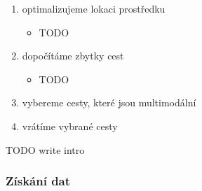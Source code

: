 \documentclass[thesis=M,czech]{FITthesis}[2019/12/23]
\theoremstyle{plain}
\theoremstyle{definition}
\begin{document}
\begin{enumerate}
	\item optimalizujeme lokaci prostředku
	\begin{itemize}
		\item TODO
	\end{itemize}
	\item dopočítáme zbytky cest
	\begin{itemize}
		\item TODO
	\end{itemize}
	\item vybereme cesty, které jsou multimodální
	\item vrátíme vybrané cesty



\end{enumerate}


TODO write intro

% 

\subsubsection{Získání dat}

\end{document}
